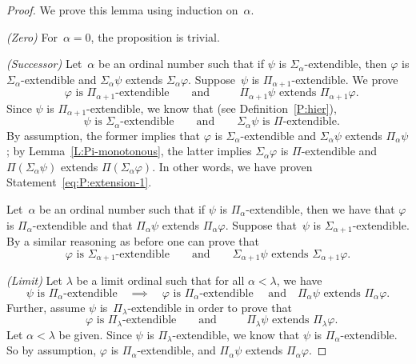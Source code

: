 \documentclass[main.tex]{subfiles}
\begin{document}
\begin{proof}
We prove this lemma using induction on~$\alpha$.

\noindent\emph{(Zero)} For~$\alpha=0$, the proposition is trivial.

\noindent\emph{(Successor)} 
Let~$\alpha$ be an ordinal number such that
if $\psi$ is $\Sigma_\alpha$-extendible,
then
$\varphi$ is $\Sigma_\alpha$-extendible 
and $\Sigma_\alpha\psi$ extends $\Sigma_\alpha\varphi$.
Suppose~$\psi$
is $\Pi_{\alpha+1}$-extendible.
We prove
\begin{equation}
\label{eq:P:extension-1}
\text{ $\varphi$ is $\Pi_{\alpha+1}$-extendible}
\qquad\text{and}\qquad
\text{ $\Pi_{\alpha+1}\psi$ extends $\Pi_{\alpha+1}\varphi$.}
\end{equation}
Since $\psi$ is $\Pi_{\alpha+1}$-extendible,
we know that
(see Definition~\ref{P:hier}),
\begin{equation*}
\text{ $\psi$ is $\Sigma_\alpha$-extendible}
\qquad\text{and}\qquad
\text{$\Sigma_\alpha\psi$ is~$\Pi$-extendible}.
\end{equation*}
By assumption, 
the former implies that $\varphi$ is $\Sigma_\alpha$-extendible
and $\Sigma_\alpha\psi$ extends $\Pi_\alpha\psi$;
by Lemma~\ref{L:Pi-monotonous},
the latter implies $\Sigma_\alpha\varphi$
is $\Pi$-extendible
and $\Pi(\Sigma_\alpha\psi)$ extends $\Pi(\Sigma_\alpha \varphi)$.
In other words,
we have proven Statement~\eqref{eq:P:extension-1}.

Let~$\alpha$ be an ordinal number such that
if $\psi$ is $\Pi_\alpha$-extendible,
then we have that
$\varphi$ is $\Pi_\alpha$-extendible 
and that $\Pi_\alpha\psi$ extends $\Pi_\alpha\varphi$.
Suppose that~$\psi$
is $\Sigma_{\alpha+1}$-extendible.
By a similar reasoning
as before one can prove that
\begin{equation*}
\text{$\varphi$ is $\Sigma_{\alpha+1}$-extendible}
\qquad\text{and}\qquad
\text{$\Sigma_{\alpha+1}\psi$ extends $\Sigma_{\alpha+1}\varphi$.}
\end{equation*}

\noindent\emph{(Limit)}
Let $\lambda$ be a limit ordinal such that
for all $\alpha<\lambda$, we have
\begin{equation*}
\text{$\psi$ is $\Pi_\alpha$-extendible}
\quad\implies\quad
\text{$\varphi$ is $\Pi_\alpha$-extendible }
\quad\text{and}\quad
\text{$\Pi_\alpha\psi$ extends $\Pi_\alpha\varphi$.}
\end{equation*}
Further, 
assume $\psi$ is~$\Pi_\lambda$-extendible
in order to prove that
\begin{equation}
\label{eq:P:extension-2}
\text{ $\varphi$ is $\Pi_{\lambda}$-extendible}
\qquad\text{and}\qquad
\text{ $\Pi_{\lambda}\psi$ extends $\Pi_{\lambda}\varphi$.}
\end{equation}
Let $\alpha <\lambda$ be given.
Since $\psi$ is $\Pi_\lambda$-extendible,
we know that $\psi$ is $\Pi_\alpha$-extendible.
So by assumption, 
$\varphi$ is $\Pi_\alpha$-extendible,
and $\Pi_\alpha \psi$ extends $\Pi_\alpha \varphi$.


\end{proof}
\end{document}
